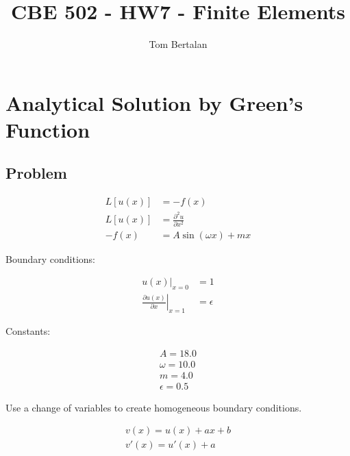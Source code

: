 \documentclass[10pt]{article}
\title{CBE 502 - HW7 - Finite Elements}
\author{Tom Bertalan}
\begin{document}
\maketitle

\tableofcontents

\listoffigures

\section{Analytical Solution by Green's Function}
\label{sec:green}

\subsection{Problem}

\begin{equation}
    \label{eqn:problem}
    \begin{split}
        L[u(x)] &= -f(x) \\
        L[u(x)] &=  \frac{\partial^2 u}{\partial x^2} \\
        -f(x) &= A \sin (\omega x) + m x
    \end{split}
\end{equation}

Boundary conditions:

\begin{equation}
    \begin{split}
        \left. u(x) \right| _{x=0} &= 1 \\
        \left. \frac{\partial u(x)}{\partial x}\right|_{x=1} &= \epsilon
    \end{split}
\end{equation}

Constants:

\begin{equation}
    \label{eqn:constants}
    \begin{split}
        A = 18.0 \\
        \omega = 10.0 \\
        m = 4.0 \\
        \epsilon = 0.5
    \end{split}
\end{equation}


Use a change of variables to create homogeneous boundary conditions.

\begin{equation}
    \label{eqn:changeofvars}
    \begin{split}
        v(x) = u(x) + a x + b \\
        v'(x) = u'(x) + a \\
    \end{split}
\end{equation}
\end{document}
